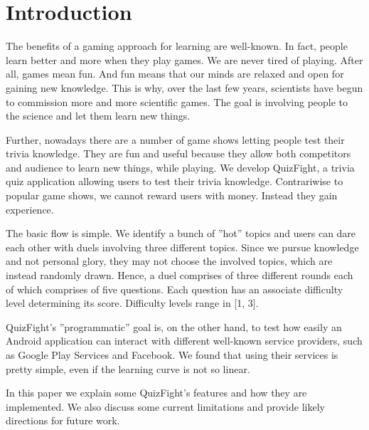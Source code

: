 \section{Introduction}
The benefits of a gaming approach for learning are well-known. In fact, people learn better and more when they play games. We are never tired of playing. After all, games mean fun. And fun means that our minds are relaxed and open for gaining new knowledge. This is why, over the last few years, scientists have begun to commission more and more scientific games. The goal is involving people to the science and let them learn new things.

Further, nowadays there are a number of game shows letting people test their trivia knowledge. They are fun and useful because they allow both competitors and audience to learn new things, while playing. We develop QuizFight, a trivia quiz application allowing users to test their trivia knowledge. Contrariwise to popular game shows, we cannot reward users with money. Instead they gain experience. 

The basic flow is simple. We identify a bunch of ''hot'' topics and users can dare each other with duels involving three different topics. Since we pursue knowledge and not personal glory, they may not choose the involved topics, which are instead randomly drawn. Hence, a duel comprises of three different rounds each of which comprises of five questions. Each question has an associate difficulty level determining its score. Difficulty levels range in [1, 3].

QuizFight's ''programmatic'' goal is, on the other hand, to test how easily an Android application can interact with different well-known service providers, such as Google Play Services and Facebook. We found that using their services is pretty simple, even if the learning curve is not so linear.

In this paper we explain some QuizFight's features and how they are implemented. We also discuss some current limitations and provide likely directions for future work. 


